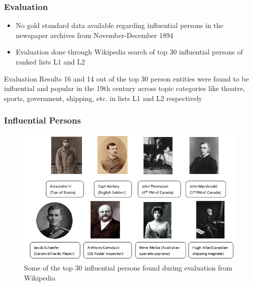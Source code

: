 \documentclass{beamer}
\begin{document}
\begin{frame}
\frametitle{Evaluation}
\begin{itemize}
\item
No gold standard data available regarding influential persons  in the newspaper archives from November-December 1894
\item
Evaluation done through Wikipedia search of top 30 influential persons of ranked lists L1 and L2
\end{itemize}

\begin{block}{Evaluation Results}
 16 and 14 out of the top 30 person entities were found to be influential and popular in the 19th century across topic categories like theatre, sports, government, shipping, etc. in lists L1 and L2 respectively
\end{block}
\end{frame}



\begin{frame}
\frametitle{Influential Persons}
\begin{figure}
\centering
 \includegraphics[scale=0.6]{images/ip}
\caption{Some of the top 30 influential persons found during evaluation from Wikipedia}

\end{figure}
\end{frame}
\end{document}

